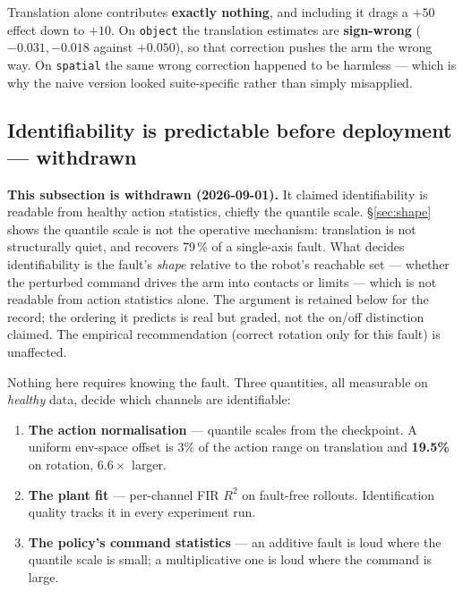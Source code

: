 \documentclass[11pt,a4paper]{article}
\newcommand{\code}[1]{\texttt{\small #1}}
\begin{document}
Translation alone contributes \textbf{exactly nothing}, and including it drags a
$+50$ effect down to $+10$. On \code{object} the translation estimates are
\textbf{sign-wrong} ($-0.031, -0.018$ against $+0.050$), so that correction pushes
the arm the wrong way. On \code{spatial} the same wrong correction happened to be
harmless --- which is why the naive version looked suite-specific rather than
simply misapplied.

\subsection{Identifiability is predictable before deployment --- \textbf{withdrawn}}
\label{sec:predictable}

\begin{tcolorbox}[colback=red!4,colframe=red!45!black]
\textbf{This subsection is withdrawn (2026-09-01).} It claimed identifiability is
readable from healthy action statistics, chiefly the quantile scale.
\S\ref{sec:shape} shows the quantile scale is not the operative mechanism:
translation is not structurally quiet, and recovers 79\,\% of a single-axis fault.
What decides identifiability is the fault's \emph{shape} relative to the robot's
reachable set --- whether the perturbed command drives the arm into contacts or
limits --- which is not readable from action statistics alone. The argument is
retained below for the record; the ordering it predicts is real but graded, not the
on/off distinction claimed. The empirical recommendation (correct rotation only for
this fault) is unaffected.
\end{tcolorbox}

Nothing here requires knowing the fault. Three quantities, all measurable on
\emph{healthy} data, decide which channels are identifiable:

\begin{enumerate}[leftmargin=1.5em,itemsep=2pt]
  \item \textbf{The action normalisation} --- quantile scales from the checkpoint.
        A uniform env-space offset is 3\% of the action range on translation and
        \textbf{19.5\%} on rotation, $6.6\times$ larger.
  \item \textbf{The plant fit} --- per-channel FIR $R^2$ on fault-free rollouts.
        Identification quality tracks it in every experiment run.
  \item \textbf{The policy's command statistics} --- an additive fault is loud
        where the quantile scale is small; a multiplicative one is loud where the
        command is large.
\end{enumerate}
\end{document}
